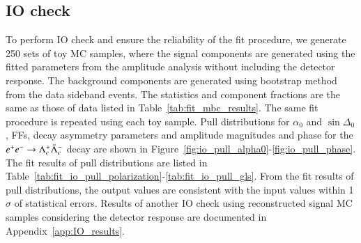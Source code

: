 \subsection{IO check}
\label{sec:io_check}
To perform IO check and ensure the reliability of the fit procedure, we generate 250 sets of toy MC samples, where the signal components are generated using the fitted parameters from the amplitude analysis without including the detector response. The background components are generated using bootstrap method from the data sideband events. The statistics and component fractions are the same as those of data listed in Table~\ref{tab:fit_mbc_results}. The same fit procedure is repeated using each toy sample. Pull distributions for $\alpha_0$ and $\sin\Delta_0$, FFs, decay asymmetry parameters and amplitude magnitudes and phase for the $e^+e^-\rightarrow\Lambda_{c}^{+}\bar{\Lambda}_{c}^{-}$ decay are shown in Figure~\ref{fig:io_pull_alpha0}-\ref{fig:io_pull_phase}.
The fit results of pull distributions are listed in Table~\ref{tab:fit_io_pull_polarization}-\ref{tab:fit_io_pull_gls}. From the fit results of pull distributions, the output values are consistent with the input values within 1$\sigma$ of statistical errors.
Results of another IO check using reconstructed signal MC samples considering the detector response are documented in Appendix~\ref{app:IO_results}.

